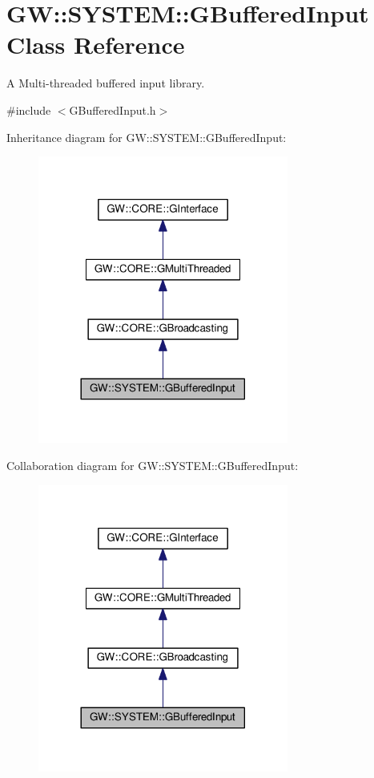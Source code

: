 \hypertarget{classGW_1_1SYSTEM_1_1GBufferedInput}{}\section{GW\+:\+:S\+Y\+S\+T\+EM\+:\+:G\+Buffered\+Input Class Reference}
\label{classGW_1_1SYSTEM_1_1GBufferedInput}


A Multi-\/threaded buffered input library.  




{\ttfamily \#include $<$G\+Buffered\+Input.\+h$>$}



Inheritance diagram for GW\+:\+:S\+Y\+S\+T\+EM\+:\+:G\+Buffered\+Input\+:\nopagebreak
\begin{figure}[H]
\begin{center}
\leavevmode
\includegraphics[width=233pt]{classGW_1_1SYSTEM_1_1GBufferedInput__inherit__graph}
\end{center}
\end{figure}


Collaboration diagram for GW\+:\+:S\+Y\+S\+T\+EM\+:\+:G\+Buffered\+Input\+:\nopagebreak
\begin{figure}[H]
\begin{center}
\leavevmode
\includegraphics[width=233pt]{classGW_1_1SYSTEM_1_1GBufferedInput__coll__graph}
\end{center}
\end{figure}
